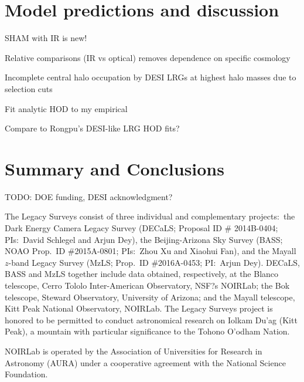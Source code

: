 \documentclass[twocolumn,apj,iop,tighten]{emulateapj2}
\begin{document}
\section{Model predictions and discussion}\label{sec:predictions}

SHAM with IR is new!

Relative comparisons (IR vs optical) removes dependence on specific cosmology

Incomplete central halo occupation by DESI LRGs at highest halo masses due to selection cuts

Fit analytic HOD to my empirical

Compare to Rongpu's DESI-like LRG HOD fits?




\section{Summary and Conclusions}\label{}


\acknowledgements

TODO: DOE funding, DESI acknowledgment?

The Legacy Surveys consist of three individual and complementary projects:\ the Dark Energy Camera Legacy Survey (DECaLS; Proposal ID \# 2014B-0404; PIs:\ David Schlegel and Arjun Dey), the Beijing-Arizona Sky Survey (BASS; NOAO Prop.\ ID \#2015A-0801; PIs:\ Zhou Xu and Xiaohui Fan), and the Mayall $z$-band Legacy Survey (MzLS; Prop.\ ID \#2016A-0453; PI:\ Arjun Dey). DECaLS, BASS and MzLS together include data obtained, respectively, at the Blanco telescope, Cerro Tololo Inter-American Observatory, NSF?s NOIRLab; the Bok telescope, Steward Observatory, University of Arizona; and the Mayall telescope, Kitt Peak National Observatory, NOIRLab. The Legacy Surveys project is honored to be permitted to conduct astronomical research on Iolkam Du'ag (Kitt Peak), a mountain with particular significance to the Tohono O'odham Nation.

NOIRLab is operated by the Association of Universities for Research in Astronomy (AURA) under a cooperative agreement with the National Science Foundation.
\end{document}
